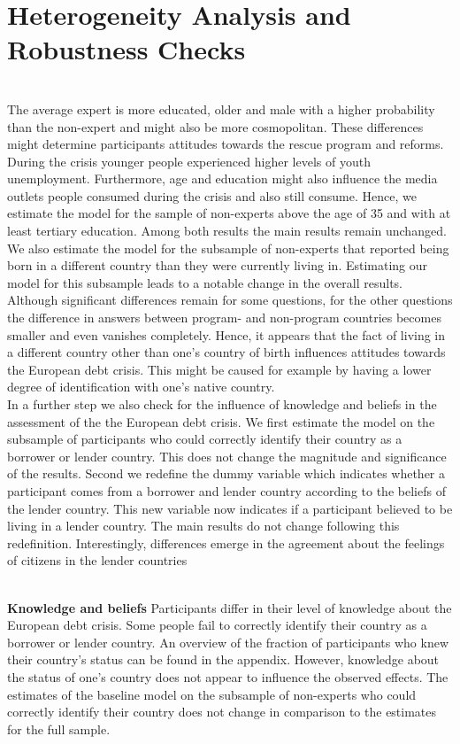 \section{Heterogeneity Analysis and Robustness Checks}
 
\\
 The average expert is more educated, older and male with a higher probability than the non-expert and might also be more cosmopolitan. These differences might determine participants attitudes towards the rescue program and reforms. During the crisis younger people experienced higher levels of youth unemployment. Furthermore, age and education might also influence the media outlets people consumed during the crisis and also still consume. Hence, we estimate the model for the sample of non-experts above the age of 35 and with at least tertiary education. Among both results the main results remain unchanged. We also estimate the model for the subsample of non-experts that reported being born in a different country than they were currently living in. Estimating our model for this subsample leads to a notable change in the overall results. Although significant differences remain for some questions, for the other questions the difference in answers between program- and non-program countries becomes smaller and even vanishes completely. Hence, it appears that the fact of living in a different country other than one's country of birth influences attitudes towards the European debt crisis. This might be caused for example by having a lower degree of identification with one's native country.
\\
In a further step we also check for the influence of knowledge and beliefs in the assessment of the the European debt crisis. We first estimate the model on the subsample of participants who could correctly identify their country as a borrower or lender country. This does not change the magnitude and significance of the results. Second we redefine the dummy variable which indicates whether a participant comes from a borrower and lender country according to the beliefs of the lender country. This new variable now indicates if a participant believed to be living in a lender country. The main results do not change following this redefinition. Interestingly, differences emerge in the agreement about the feelings of citizens in the lender countries



 
\\
\textbf{Knowledge and beliefs} 
Participants differ in their level of knowledge about the European debt crisis. Some people fail to correctly identify their country as a borrower or lender country. An overview of the fraction of participants who knew their country's status can be found in the appendix. However, knowledge about the status of one's country does not appear to influence the observed effects. The estimates of the baseline model on the subsample of non-experts who could correctly identify their country does not change in comparison to the estimates for the full sample. 


